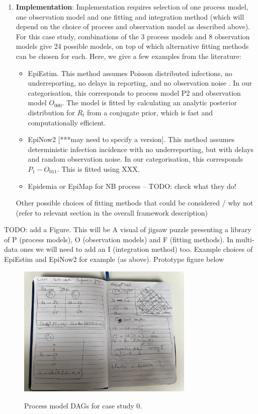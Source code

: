 \documentclass{article}
\begin{document}
\begin{enumerate}
\item \textbf{Implementation}: Implementation requires selection of one process model, one observation model and one fitting and integration method (which will depend on the choice of process and observation model as described above). For this case study, combinations of the 3 process models and 8 observation models give 24 possible models, on top of which alternative fitting methods can be chosen for each. Here, we give a few examples from the literature:
\begin{itemize}
    \item EpiEstim. This method assumes Poisson distributed infections, no underreporting, no delays in reporting, and no observation noise \citep{cori2013new}. In our categorisation, this corresponds to process model P2 and observation model $O_{000}$. The model is fitted by calculating an analytic posterior distribution for $R_t$ from a conjugate prior, which is fast and computationally efficient. 
    \item EpiNow2 [***may need to specify a version]. This method assumes deterministic infection incidence with no underreporting, but with delays and random observation noise. In our categorisation, this corresponds $P_1-O_{011}$. This is fitted using XXX.
    \item Epidemia or EpiMap for NB process – TODO: check what they do!
\end{itemize}

Other possible choices of fitting methods that could be considered / why not (refer to relevant section in the overall framework description)
 \end{enumerate}
 
TODO: add a Figure. This will be A visual of jigsaw puzzle presenting a library of P (process models), O (observation models) and F (fitting methods). In multi-data ones we will need to add an I (integration method) too.
Example choices of EpiEstim and EpiNow2 for example (as above). Prototype figure below

\begin{figure}
\includegraphics[width=0.75\textwidth]{figures/cs0_diagram1.jpg}
\label{fig:CS0_DAGs}
\caption{Process model DAGs for case study 0.}
\end{figure}
\end{document}
